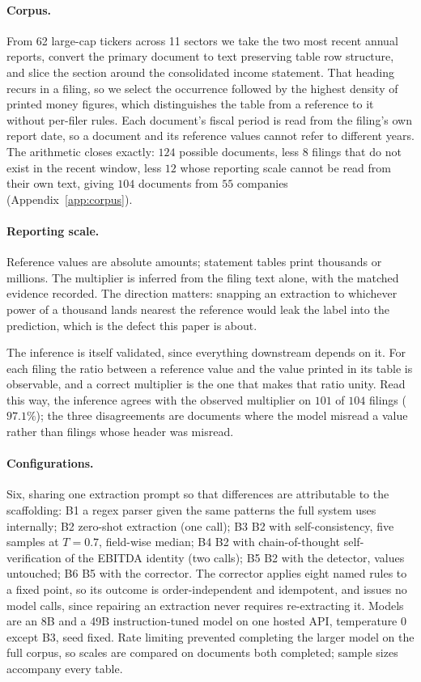 \documentclass[11pt]{article}
\begin{document}
\paragraph{Corpus.} From 62 large-cap tickers across 11 sectors we take the two most
recent annual reports, convert the primary document to text preserving table row
structure, and slice the section around the consolidated income statement. That heading
recurs in a filing, so we select the occurrence followed by the highest density of
printed money figures, which distinguishes the table from a reference to it without
per-filer rules. Each document's fiscal period is read from the filing's own report
date, so a document and its reference values cannot refer to different years. The
arithmetic closes exactly: $124$ possible documents, less $8$ filings that do not exist
in the recent window, less $12$ whose reporting scale cannot be read from their own
text, giving $104$ documents from $55$ companies (Appendix~\ref{app:corpus}).

\paragraph{Reporting scale.} Reference values are absolute amounts; statement tables
print thousands or millions. The multiplier is inferred from the filing text alone,
with the matched evidence recorded. The direction matters: snapping an extraction to
whichever power of a thousand lands nearest the reference would leak the label into the
prediction, which is the defect this paper is about.

The inference is itself validated, since everything downstream depends on it. For each
filing the ratio between a reference value and the value printed in its table is
observable, and a correct multiplier is the one that makes that ratio unity. Read this
way, the inference agrees with the observed multiplier on $101$ of $104$ filings
($97.1\%$); the three disagreements are documents where the model misread a value
rather than filings whose header was misread.

\paragraph{Configurations.} Six, sharing one extraction prompt so that differences are
attributable to the scaffolding: B1 a regex parser given the same patterns the
full system uses internally; B2 zero-shot extraction (one call); B3
B2 with self-consistency, five samples at $T{=}0.7$, field-wise median; B4 B2
with chain-of-thought self-verification of the EBITDA identity (two calls); B5
B2 with the detector, values untouched; B6 B5 with the corrector. The
corrector applies eight named rules to a fixed point, so its outcome is
order-independent and idempotent, and issues no model calls, since repairing an
extraction never requires re-extracting it. Models are an 8B and a 49B
instruction-tuned model on one hosted API, temperature $0$ except B3, seed fixed. Rate
limiting prevented completing the larger model on the full corpus, so scales are
compared on documents both completed; sample sizes accompany every table.
\end{document}
